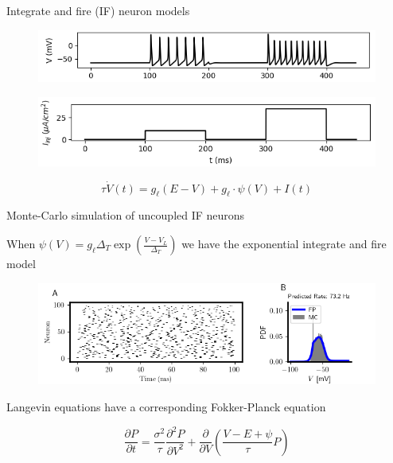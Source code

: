 \documentclass[aspectratio=169]{beamer}
\begin{document}
\begin{frame}{Integrate and fire (IF) neuron models}

\begin{figure}
\centering
\includegraphics[width=140mm]{figure-19-1}
\end{figure}

\begin{figure}
\centering
\includegraphics[width=140mm]{figure-19-2}
\end{figure}

\begin{equation*}
\tau\dot{V}(t) = g_{\ell}(E - V) + g_{\ell}\cdot \psi(V) + I(t)
\end{equation*}


\end{frame}

\begin{frame}{Monte-Carlo simulation of uncoupled IF neurons}

When $\psi(V) = g_{\ell}\Delta_{T}\exp\left(\frac{V-V_{L}}{\Delta_{T}}\right)$ we have the exponential integrate and fire model

\begin{figure}
\centering
\includegraphics[width=140mm]{figure-3-1}
\end{figure}

Langevin equations have a corresponding Fokker-Planck equation 

\begin{equation*}
\frac{\partial P}{\partial t} = \frac{\sigma^{2}}{\tau}\frac{\partial^{2}P}{\partial V^{2}} + \frac{\partial}{\partial V}\left(\frac{V-E+\psi}{\tau}P\right)
\end{equation*}

\end{frame}
\end{document}

